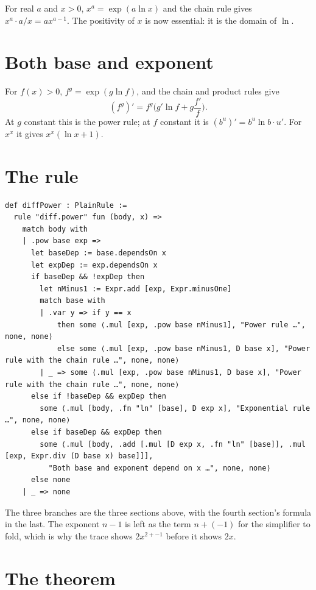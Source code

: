 For real $a$ and $x > 0$, $x^a = \exp(a \ln x)$ and the chain rule gives $x^a \cdot a/x =
a x^{a-1}$. The positivity of $x$ is now essential: it is the domain of $\ln$.

\section{Both base and exponent}

For $f(x) > 0$, $f^g = \exp(g \ln f)$, and the chain and product rules give
\[
  (f^g)' = f^g \Big( g' \ln f + g \frac{f'}{f} \Big).
\]
At $g$ constant this is the power rule; at $f$ constant it is $(b^u)' = b^u \ln b \cdot u'$.
For $x^x$ it gives $x^x(\ln x + 1)$.

\section{The rule}

\begin{verbatim}
def diffPower : PlainRule :=
  rule "diff.power" fun (body, x) =>
    match body with
    | .pow base exp =>
      let baseDep := base.dependsOn x
      let expDep := exp.dependsOn x
      if baseDep && !expDep then
        let nMinus1 := Expr.add [exp, Expr.minusOne]
        match base with
        | .var y => if y == x
            then some ⟨.mul [exp, .pow base nMinus1], "Power rule …", none, none⟩
            else some ⟨.mul [exp, .pow base nMinus1, D base x], "Power rule with the chain rule …", none, none⟩
        | _ => some ⟨.mul [exp, .pow base nMinus1, D base x], "Power rule with the chain rule …", none, none⟩
      else if !baseDep && expDep then
        some ⟨.mul [body, .fn "ln" [base], D exp x], "Exponential rule …", none, none⟩
      else if baseDep && expDep then
        some ⟨.mul [body, .add [.mul [D exp x, .fn "ln" [base]], .mul [exp, Expr.div (D base x) base]]],
          "Both base and exponent depend on x …", none, none⟩
      else none
    | _ => none
\end{verbatim}

The three branches are the three sections above, with the fourth section's formula in the last.
The exponent $n - 1$ is left as the term $n + (-1)$ for the simplifier to fold, which is why the
trace shows $2 x^{2 + -1}$ before it shows $2x$.

\section{The theorem}

